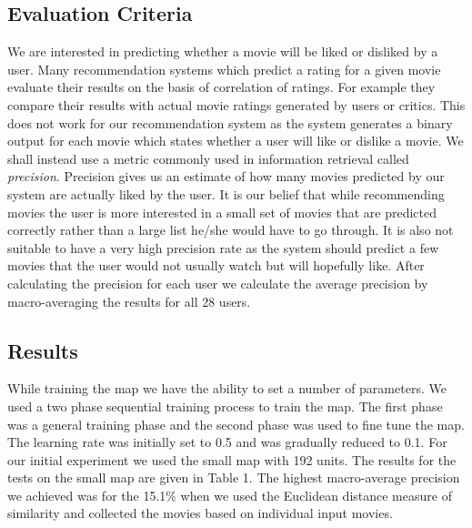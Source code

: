 \documentclass[conference]{IEEEtran}
\begin{document}
\subsection{Evaluation Criteria}

We are interested in predicting whether a movie will be liked or disliked by a user. Many recommendation systems which predict a rating for a given movie evaluate their results on the basis of correlation of ratings. For example they compare their results with actual movie ratings generated by users or critics. This does not work for our recommendation system as the system generates a binary output for each movie which states whether a user will like or dislike a movie. We shall instead use a metric commonly used in information retrieval called \textit{precision}. Precision gives us an estimate of how many movies predicted by our system are actually liked by the user. It is our belief that while recommending movies the user is more interested in a small set of movies that are predicted correctly rather than a large list he/she would have to go through. It is also not suitable to have a very high precision rate as the system should predict a few movies that the user would not usually watch but will hopefully like. After calculating the precision for each user we calculate the average precision by macro-averaging the results for all 28 users.

\subsection{Results}
While training the map we have the ability to set a number of parameters. We used a two phase sequential training process to train the map. The first phase was a general training phase and the second phase was used to fine tune the map. The learning rate was initially set to 0.5 and was gradually reduced to 0.1. For our initial experiment we used the small map with 192 units. The results for the tests on the small map are given in Table 1. The highest macro-average precision we achieved was for the 15.1\% when we used the Euclidean distance measure of similarity and collected the movies based on individual input movies.
\end{document}
